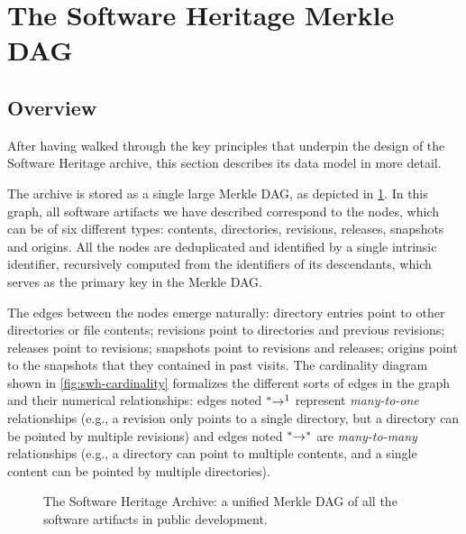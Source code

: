 \section{The Software Heritage Merkle DAG}

\subsection{Overview}

After having walked through the key principles that underpin the design of the
Software Heritage archive, this section describes its data model in more
detail.

The archive is stored as a single large Merkle \gls{DAG}, as depicted
in \cref{fig:swh-model}. In this graph, all software artifacts we have
described correspond to the nodes, which can be of six different types:
contents, directories, revisions, releases, snapshots and origins.
All the nodes are deduplicated and identified by a single intrinsic
identifier, recursively computed from the identifiers of its descendants, which
serves as the primary key in the Merkle \gls{DAG}.

The edges between the nodes emerge naturally: directory entries point to other
directories or file contents; revisions point to directories and previous
revisions; releases point to revisions; snapshots point to revisions and
releases; origins point to the snapshots that they contained in past visits.
The cardinality diagram shown in \cref{fig:swh-cardinality} formalizes the
different sorts of edges in the graph and their numerical relationships: edges
noted $\prescript{\ast}{}\rightarrow^1$ represent \emph{many-to-one}
relationships (e.g., a revision only points to a single directory, but a
directory can be pointed by multiple revisions) and edges noted
$\prescript{\ast}{}\rightarrow^\ast$ are \emph{many-to-many} relationships
(e.g., a directory can point to multiple contents, and a single content can be
pointed by multiple directories).

\begin{figure}
    \centering
    
    \caption{The Software Heritage Archive: a unified Merkle \gls{DAG} of all
    the software artifacts in public development.}%
    \label{fig:swh-model}
\end{figure}

